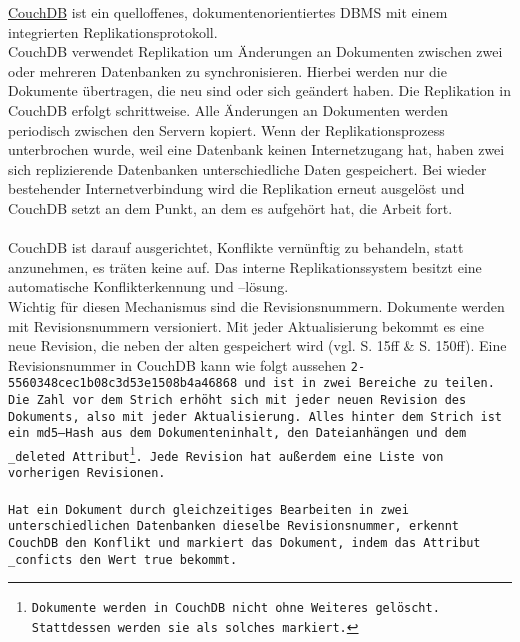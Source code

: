 \hyperref[chap:couch]{CouchDB} ist ein quelloffenes, dokumentenorientiertes \gls{DBMS} mit einem integrierten Replikationsprotokoll.\\
CouchDB verwendet Replikation um Änderungen an Dokumenten zwischen zwei oder mehreren Datenbanken zu synchronisieren.
Hierbei werden nur die Dokumente übertragen, die neu sind oder sich geändert haben.
Die Replikation in CouchDB erfolgt schrittweise. Alle Änderungen an Dokumenten werden periodisch zwischen den Servern kopiert.
Wenn der Replikationsprozess unterbrochen wurde, weil eine Datenbank keinen Internetzugang hat, haben zwei sich replizierende Datenbanken unterschiedliche Daten gespeichert.
Bei wieder bestehender Internetverbindung wird die Replikation erneut ausgelöst und CouchDB setzt an dem Punkt, an dem es aufgehört hat, die Arbeit fort.\\\\
%
%
CouchDB ist darauf ausgerichtet, Konflikte vernünftig zu behandeln, statt anzunehmen, es träten keine auf.
Das interne Replikationssystem besitzt eine automatische Konflikterkennung und --lösung.\\
Wichtig für diesen Mechanismus sind die Revisionsnummern.
Dokumente werden mit Revisionsnummern versioniert. Mit jeder Aktualisierung bekommt es eine neue Revision, die neben der alten gespeichert wird (vgl. \cite{couchDB} S. 15ff \& S. 150ff). 
Eine Revisionsnummer in CouchDB kann wie folgt aussehen \tt{2-5560348cec1b08c3d53e1508b4a46868} und ist in zwei Bereiche zu teilen. Die Zahl vor dem Strich erhöht sich mit jeder neuen Revision des Dokuments, also mit jeder Aktualisierung. Alles hinter dem Strich ist ein md5--\gls{Hash} aus dem Dokumenteninhalt, den Dateianhängen und dem \tt{\_deleted} Attribut\footnote{ Dokumente werden in CouchDB nicht ohne Weiteres gelöscht. Stattdessen werden sie als solches markiert.}.
Jede Revision hat außerdem eine Liste von vorherigen Revisionen.\\\\
%
%
Hat ein Dokument durch gleichzeitiges Bearbeiten in zwei unterschiedlichen Datenbanken dieselbe Revisionsnummer, erkennt CouchDB den Konflikt und markiert das Dokument, indem das Attribut \tt{\_conficts} den Wert \tt{true} bekommt.
